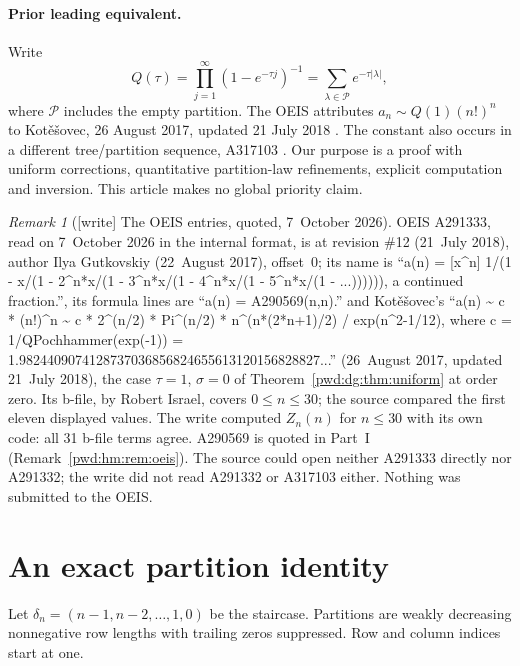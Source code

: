 \documentclass[11pt,letterpaper]{article}
\numberwithin{equation}{section}
\theoremstyle{remark}\newtheorem{remark}[theorem]{Remark}
\newcommand{\Part}{\mathcal P}
\begin{document}
\paragraph{Prior leading equivalent.}
Write
\begin{equation}\label{pwd:dg:eq:Q}
 Q(\tau)=\prod_{j=1}^{\infty}(1-e^{-\tau j})^{-1}
       =\sum_{\lambda\in\Part}e^{-\tau|\lambda|},
\end{equation}
where $\Part$ includes the empty partition. The OEIS attributes $a_n\sim Q(1)(n!)^n$ to Kot\v e\v sovec, 26 August 2017, updated 21 July 2018 \cite{oeis291333}. The constant also occurs in a different tree/partition sequence, A317103 \cite{oeis317103}. Our purpose is a proof with uniform corrections, quantitative partition-law refinements, explicit computation and inversion. This article makes no global priority claim.

\begin{remark}[{[write]} The OEIS entries, quoted, 7~October 2026]\label{pwd:dg:rem:oeis}
OEIS A291333, read on 7~October 2026 in the internal format, is at revision
\#12 (21~July 2018), author Ilya Gutkovskiy (22~August 2017), offset~0; its
name is ``a(n) = [x\^{}n] 1/(1 - x/(1 - 2\^{}n*x/(1 - 3\^{}n*x/(1 - 4\^{}n*x/(1 -
5\^{}n*x/(1 - ...)))))), a continued fraction.'', its formula lines are ``a(n) =
A290569(n,n).'' and Kot\v e\v sovec's ``a(n) \textasciitilde{} c * (n!)\^{}n
\textasciitilde{} c * 2\^{}(n/2) * Pi\^{}(n/2) * n\^{}(n*(2*n+1)/2) /
exp(n\^{}2-1/12), where c = 1/QPochhammer(exp(-1)) =
1.9824409074128737036856824655613120156828827...'' (26~August 2017, updated
21~July 2018), the case $\tau=1$, $\sigma=0$ of Theorem~\ref{pwd:dg:thm:uniform}
at order zero. Its b-file, by Robert Israel, covers $0\le n\le30$; the source
compared the first eleven displayed values. The write computed $Z_n(n)$ for
$n\le30$ with its own code: all 31 b-file terms agree. A290569 is quoted in
Part~I (Remark~\ref{pwd:hm:rem:oeis}). The source could open neither A291333
directly nor A291332; the write did not read A291332 or A317103 either.
Nothing was submitted to the OEIS.
\end{remark}

\section{An exact partition identity}\label{pwd:dg:sec:exact}
Let $\delta_n=(n-1,n-2,\ldots,1,0)$ be the staircase. Partitions are weakly decreasing nonnegative row lengths with trailing zeros suppressed. Row and column indices start at one.
\end{document}
